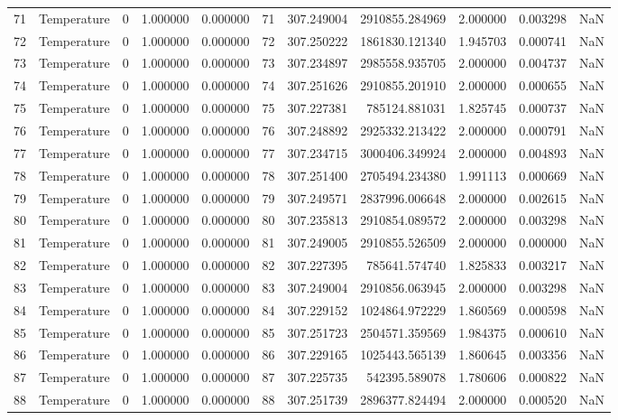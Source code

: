 \begin{tabular}{llrrrrrrrrr}
71 & Temperature & 0 & 1.000000 & 0.000000 & 71 & 307.249004 & 2910855.284969 & 2.000000 & 0.003298 & NaN \\
72 & Temperature & 0 & 1.000000 & 0.000000 & 72 & 307.250222 & 1861830.121340 & 1.945703 & 0.000741 & NaN \\
73 & Temperature & 0 & 1.000000 & 0.000000 & 73 & 307.234897 & 2985558.935705 & 2.000000 & 0.004737 & NaN \\
74 & Temperature & 0 & 1.000000 & 0.000000 & 74 & 307.251626 & 2910855.201910 & 2.000000 & 0.000655 & NaN \\
75 & Temperature & 0 & 1.000000 & 0.000000 & 75 & 307.227381 & 785124.881031 & 1.825745 & 0.000737 & NaN \\
76 & Temperature & 0 & 1.000000 & 0.000000 & 76 & 307.248892 & 2925332.213422 & 2.000000 & 0.000791 & NaN \\
77 & Temperature & 0 & 1.000000 & 0.000000 & 77 & 307.234715 & 3000406.349924 & 2.000000 & 0.004893 & NaN \\
78 & Temperature & 0 & 1.000000 & 0.000000 & 78 & 307.251400 & 2705494.234380 & 1.991113 & 0.000669 & NaN \\
79 & Temperature & 0 & 1.000000 & 0.000000 & 79 & 307.249571 & 2837996.006648 & 2.000000 & 0.002615 & NaN \\
80 & Temperature & 0 & 1.000000 & 0.000000 & 80 & 307.235813 & 2910854.089572 & 2.000000 & 0.003298 & NaN \\
81 & Temperature & 0 & 1.000000 & 0.000000 & 81 & 307.249005 & 2910855.526509 & 2.000000 & 0.000000 & NaN \\
82 & Temperature & 0 & 1.000000 & 0.000000 & 82 & 307.227395 & 785641.574740 & 1.825833 & 0.003217 & NaN \\
83 & Temperature & 0 & 1.000000 & 0.000000 & 83 & 307.249004 & 2910856.063945 & 2.000000 & 0.003298 & NaN \\
84 & Temperature & 0 & 1.000000 & 0.000000 & 84 & 307.229152 & 1024864.972229 & 1.860569 & 0.000598 & NaN \\
85 & Temperature & 0 & 1.000000 & 0.000000 & 85 & 307.251723 & 2504571.359569 & 1.984375 & 0.000610 & NaN \\
86 & Temperature & 0 & 1.000000 & 0.000000 & 86 & 307.229165 & 1025443.565139 & 1.860645 & 0.003356 & NaN \\
87 & Temperature & 0 & 1.000000 & 0.000000 & 87 & 307.225735 & 542395.589078 & 1.780606 & 0.000822 & NaN \\
88 & Temperature & 0 & 1.000000 & 0.000000 & 88 & 307.251739 & 2896377.824494 & 2.000000 & 0.000520 & NaN \\

\end{tabular}
